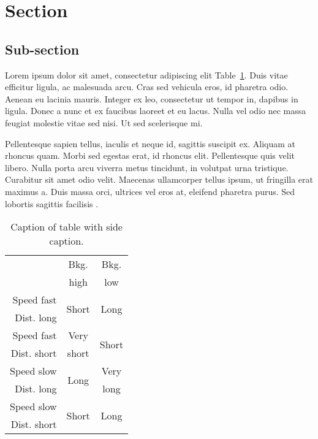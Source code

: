 \section{Section}
\subsection{Sub-section}
Lorem ipsum dolor sit amet, consectetur adipiscing elit Table~\ref{tab:table_2}. Duis vitae efficitur ligula, ac malesuada arcu. Cras sed vehicula eros, id pharetra odio. Aenean eu lacinia mauris. Integer ex leo, consectetur ut tempor in, dapibus in ligula. Donec a nunc et ex faucibus laoreet et eu lacus. Nulla vel odio nec massa feugiat molestie vitae sed nisi. Ut sed scelerisque mi.

Pellentesque sapien tellus, iaculis et neque id, sagittis suscipit ex. Aliquam at rhoncus quam. Morbi sed egestas erat, id rhoncus elit. Pellentesque quis velit libero. Nulla porta arcu viverra metus tincidunt, in volutpat urna tristique. Curabitur sit amet odio velit. Maecenas ullamcorper tellus ipsum, ut fringilla erat maximus a. Duis massa orci, ultrices vel eros at, eleifend pharetra purus. Sed lobortis sagittis facilisis \cite{Long:2007uv}.

\begin{table}
	\tcapside
	{\caption{Caption of table with side caption.}\label{tab:table_2}}
	{\begin{tabular}{rcc}
		\toprule
		& Bkg. & Bkg. \\
		& high & low \\
		\midrule
		Speed fast & \multirow{2}{*}{Short} & \multirow{2}{*}{Long} \\
		Dist. long & & \\
		\midrule
		Speed fast & Very & \multirow{2}{*}{Short} \\
		Dist. short & short & \\
		\midrule
		Speed slow & \multirow{2}{*}{Long} & Very \\
		Dist. long &  & long \\
		\midrule
		Speed slow & \multirow{2}{*}{Short} & \multirow{2}{*}{Long} \\
		Dist. short & & \\
		\bottomrule
	\end{tabular}}
\end{table}
